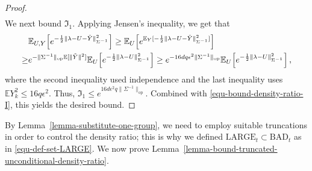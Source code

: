 \documentclass[11pt]{article}
\def\E{\mathbb{E}}
\numberwithin{equation}{section}
\begin{document}
\begin{proof}
\begin{align}
    \label{equ-bound-density-ratio-I}
\end{align}
We next bound $\mathfrak I_1$. Applying Jensen's inequality, we get that 
\begin{align*}
    & \mathbb{E}_{U,Y} \Big[ e^{  -\frac{1}{2} \| \lambda - U - \Tilde{Y} \|^2_{\Sigma^{-1}}  } \Big] \geq \mathbb{E}_{U} \Big[ e^{ \mathbb{E}_{Y} [ -\frac{1}{2} \| \lambda - U - \Tilde{Y} \|^2_{\Sigma^{-1}} ] }  \Big] \\
    \geq & e^{ - \| \Sigma^{-1} \|_{\mathrm{op}} \mathbb{E}[ \| \Tilde{Y} \|^2 ] } \mathbb{E}_{U} \Big[ e^{ -\frac{1}{2} \| \lambda - U \|^2_{\Sigma^{-1}} }  \Big] \geq e^{- 16 d q \epsilon^2 \| \Sigma^{-1} \|_{\mathrm{op}} }  \mathbb{E}_{U} \Big[ e^{ -\frac{1}{2} \| \lambda - U \|^2_{\Sigma^{-1}} }  \Big] \,,
\end{align*}
where the second inequality used independence and the last inequality uses $\E Y_k^2 \leq 16 q \epsilon^2$. Thus,
$\mathfrak I_1 \leq e^{16d \epsilon^2 q \| \Sigma^{-1} \|_{\mathrm{op}}} $. 
Combined with \eqref{equ-bound-density-ratio-I}, this yields the desired bound.
\end{proof}

By Lemma~\ref{lemma-substitute-one-group}, we need to employ suitable truncations in order to control the density ratio; this is why we defined $\mathrm{LARGE}_t \subset \mathrm{BAD}_t$ as in \eqref{equ-def-set-LARGE}. We now prove Lemma~\ref{lemma-bound-truncated-unconditional-density-ratio}.
\end{document}
